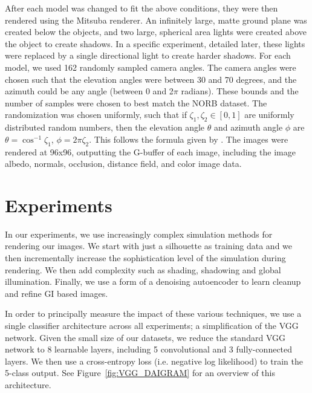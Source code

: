 \documentclass[10pt,twocolumn,letterpaper]{article}
\begin{document}
After each model was changed to fit the above conditions, they were then rendered using the Mitsuba renderer. An infinitely large, matte ground plane was created below the objects, and two large, spherical area lights were created above the object to create shadows. In a specific experiment, detailed later, these lights were replaced by a single directional light to create harder shadows. For each model, we used 162 randomly sampled camera angles. The camera angles were chosen such that the elevation angles were between 30 and 70 degrees, and the azimuth could be any angle (between 0 and 2$\pi$ radians). These bounds and the number of samples were chosen to best match the NORB dataset. The randomization was chosen uniformly, such that if $\zeta_1,\zeta_2\in[0,1]$ are uniformly distributed random numbers, then the elevation angle $\theta$ and azimuth angle $\phi$ are $\theta = \cos^{-1}\zeta_1$, $\phi = 2\pi \zeta_2$. This follows the formula given by \cite{Pharr:2010:PBR:1854996}. The images were rendered at 96x96, outputting the G-buffer of each image, including the image albedo, normals, occlusion, distance field, and color image data.

\section{Experiments}

In our experiments, we use increasingly complex simulation methods for rendering our images.  We start with just a silhouette as training data and we then incrementally increase the sophistication level of the simulation during rendering.  We then add complexity such as shading, shadowing and global illumination. Finally, we use a form of a denoising autoencoder to learn cleanup and refine GI based images.%

In order to principally measure the impact of these various techniques, we use a single classifier architecture across all experiments; a simplification of the VGG network\cite{DBLP:journals/corr/SimonyanZ14a}. Given the small size of our datasets, we reduce the standard VGG network to 8 learnable layers, including 5 convolutional and 3 fully-connected layers. We then use a cross-entropy loss (i.e. negative log likelihood) to train the 5-class output. See 
Figure~\ref{fig:VGG_DAIGRAM} for an overview of this architecture.
\end{document}
